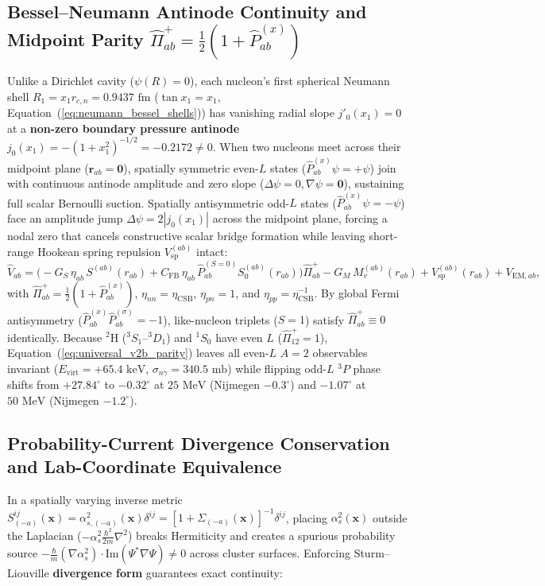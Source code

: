\documentclass[11pt, a4paper]{article}
\begin{document}
\subsection{\texorpdfstring{Bessel--Neumann Antinode Continuity and Midpoint Parity $\hat{\Pi}_{ab}^+ = \frac{1}{2}(1 + \hat{P}_{ab}^{(x)})$}{Bessel-Neumann Antinode Continuity and Midpoint Parity}}
Unlike a Dirichlet cavity ($\psi(R) = 0$), each nucleon's first spherical Neumann shell $R_1 = x_1 r_{c,n} = 0.9437\text{ fm}$ ($\tan x_1 = x_1$, Equation~(\ref{eq:neumann_bessel_shells})) has vanishing radial slope $j'_0(x_1) = 0$ at a \textbf{non-zero boundary pressure antinode} $j_0(x_1) = -(1 + x_1^2)^{-1/2} = -0.2172 \neq 0$. When two nucleons meet across their midpoint plane ($\mathbf{r}_{ab} = \mathbf{0}$), spatially symmetric even-$L$ states ($\hat{P}_{ab}^{(x)}\psi = +\psi$) join with continuous antinode amplitude and zero slope ($\Delta\psi = 0, \nabla\psi = \mathbf{0}$), sustaining full scalar Bernoulli suction. Spatially antisymmetric odd-$L$ states ($\hat{P}_{ab}^{(x)}\psi = -\psi$) face an amplitude jump $\Delta\psi = 2|j_0(x_1)|$ across the midpoint plane, forcing a nodal zero that cancels constructive scalar bridge formation while leaving short-range Hookean spring repulsion $V_{\mathrm{sp}}^{(ab)}$ intact:
\begin{equation}
    \hat{V}_{ab} = \Big(-G_S\,\eta_{ab}\,S^{(ab)}(r_{ab}) + C_{\mathrm{FB}}\,\eta_{ab}\,\hat{P}_{ab}^{(S=0)}S_0^{(ab)}(r_{ab})\Big)\hat{\Pi}_{ab}^+ - G_M\,M_v^{(ab)}(r_{ab}) + V_{\mathrm{sp}}^{(ab)}(r_{ab}) + V_{\mathrm{EM},ab},
    \label{eq:universal_v2b_parity}
\end{equation}
with $\hat{\Pi}_{ab}^+ = \frac{1}{2}(1 + \hat{P}_{ab}^{(x)})$, $\eta_{nn} = \eta_{\mathrm{CSB}}$, $\eta_{pn} = 1$, and $\eta_{pp} = \eta_{\mathrm{CSB}}^{-1}$. By global Fermi antisymmetry ($\hat{P}_{ab}^{(x)}\hat{P}_{ab}^{(\sigma)} = -1$), like-nucleon triplets ($S = 1$) satisfy $\hat{\Pi}_{ab}^+ \equiv 0$ identically. Because $^2\text{H}$ ($^3S_1\text{--}{}^3D_1$) and $^1S_0$ have even $L$ ($\hat{\Pi}_{12}^+ = 1$), Equation~(\ref{eq:universal_v2b_parity}) leaves all even-$L$ $A = 2$ observables invariant ($E_{\mathrm{virt}} = +65.4\text{ keV}$, $\sigma_{n\gamma} = 340.5\text{ mb}$) while flipping odd-$L$ $^3P$ phase shifts from $+27.84^\circ$ to $\mathbf{-0.32^\circ}$ at $25\text{ MeV}$ (Nijmegen $-0.3^\circ$) and $-1.07^\circ$ at $50\text{ MeV}$ (Nijmegen $-1.2^\circ$).

\subsection{Probability-Current Divergence Conservation and Lab-Coordinate Equivalence}
In a spatially varying inverse metric $S_{(-a)}^{ij}(\mathbf{x}) = \alpha_{s,(-a)}^2(\mathbf{x})\delta^{ij} = [1 + \Sigma_{(-a)}(\mathbf{x})]^{-1}\delta^{ij}$, placing $\alpha_s^2(\mathbf{x})$ outside the Laplacian ($-\alpha_s^2\frac{\hbar^2}{2m}\nabla^2$) breaks Hermiticity and creates a spurious probability source $-\frac{\hbar}{m}(\nabla\alpha_s^2)\cdot\mathrm{Im}(\Psi^*\nabla\Psi) \neq 0$ across cluster surfaces. Enforcing Sturm--Liouville \textbf{divergence form} guarantees exact continuity:
\end{document}
